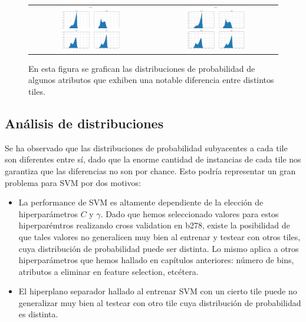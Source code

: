\begin{figure}[h!]
\begin{tabular}{cc}
\includegraphics[width=0.49\textwidth]{Kap6/features/feature_comparison_53.png}   & \includegraphics[width=0.49\textwidth]{Kap6/features/feature_comparison_60.png}  
\end{tabular}
\caption{En esta figura se grafican las distribuciones de probabilidad de algunos atributos que exhiben una notable diferencia entre distintos tiles. }
\label{fig:distribuciones_distintas}
\end{figure}

\subsection{Análisis de distribuciones}
\label{analisis_distribuciones}
Se ha observado que las distribuciones de probabilidad subyacentes a cada tile son diferentes entre sí, dado que la enorme cantidad de instancias de cada tile nos garantiza que las diferencias no son por chance. Esto podría representar un gran problema para SVM por dos motivos:

\begin{itemize}
\item La performance de SVM es altamente dependiente de la elección de hiperparámetros $C$ y $\gamma$. Dado que hemos seleccionado valores para estos hiperparémtros realizando cross validation en b278, existe la posibilidad de que tales valores no generalicen muy bien al entrenar y testear con otros tiles, cuya distribución de probabilidad puede ser distinta. Lo mismo aplica a otros hiperparámetros que hemos hallado en capítulos anteriores: número de bins, atributos a eliminar en feature selection, etcétera.
\item El hiperplano separador hallado al entrenar SVM con un cierto tile puede no generalizar muy bien al testear con otro tile cuya distribución de probabilidad es distinta.
\end{itemize}


